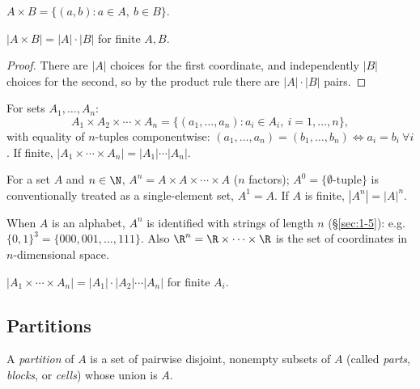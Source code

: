 \begin{definition}
$A \times B = \{(a,b) : a \in A,\ b \in B\}$.
\end{definition}

\begin{proposition}
$|A \times B| = |A|\cdot|B|$ for finite $A,B$.
\end{proposition}
\begin{proof}
There are $|A|$ choices for the first coordinate, and independently $|B|$ choices for the second, so by the product rule there are $|A|\cdot|B|$ pairs.
\end{proof}

\begin{definition}
For sets $A_1,\dots,A_n$:
\[
A_1 \times A_2 \times \cdots \times A_n = \{(a_1,\dots,a_n) : a_i \in A_i,\ i=1,\dots,n\},
\]
with equality of $n$-tuples componentwise: $(a_1,\dots,a_n)=(b_1,\dots,b_n) \iff a_i=b_i\ \forall i$. If finite, $|A_1\times\cdots\times A_n| = |A_1|\cdots|A_n|$.
\end{definition}

\begin{definition}
For a set $A$ and $n \in \N$, $A^n = A \times A \times \cdots \times A$ ($n$ factors); $A^0 = \{\emptyset\text{-tuple}\}$ is conventionally treated as a single-element set, $A^1 = A$. If $A$ is finite, $|A^n| = |A|^n$.
\end{definition}

\begin{note}
When $A$ is an alphabet, $A^n$ is identified with strings of length $n$ (\S\ref{sec:1-5}): e.g.\ $\{0,1\}^3 = \{000,001,\dots,111\}$. Also $\R^n = \R\times\cdots\times\R$ is the set of coordinates in $n$-dimensional space.
\end{note}

\begin{corollary}
$|A_1 \times \cdots \times A_n| = |A_1| \cdot |A_2| \cdots |A_n|$ for finite $A_i$.
\end{corollary}

\subsection{Partitions}
\label{sec:1-15}
\begin{definition}[Partition]
A \emph{partition} of $A$ is a set of pairwise disjoint, nonempty subsets of $A$ (called \emph{parts}, \emph{blocks}, or \emph{cells}) whose union is $A$.
\end{definition}

